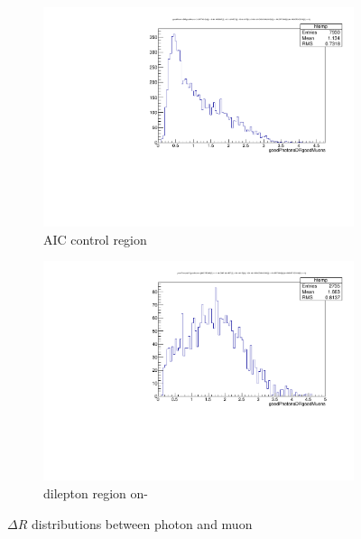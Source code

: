 \begin{figure}
\begin{center}
	\begin{subfigure}[b]{.7\textwidth}
		\includegraphics[width=\textwidth]{Background/bkg_fakeLight/goodPhotonsDRgoodMuons_AIC}
		\caption{AIC control region}
	\end{subfigure}
	\begin{subfigure}[b]{.7\textwidth}
		\includegraphics[width=\textwidth]{Background/bkg_fakeLight/goodPhotonsDRgoodMuons_ONZ}
		\caption{dilepton region on-\Z}
	\end{subfigure}
	\caption{$\Delta R$ distributions between photon and muon
	\label{fig:fakeLight_AIC_DR}}
\end{center}
\end{figure}

